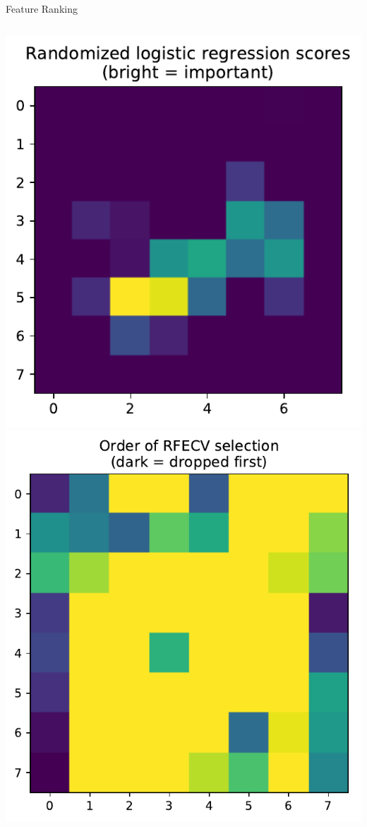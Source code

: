 \documentclass[10pt, aspectratio=169]{beamer} %
\begin{document}
\begin{frame}[fragile]{Feature Ranking}
\begin{columns}
\begin{center}
\includegraphics[width=\columnwidth]{RLR_ranking.pdf}\\
\includegraphics[width=\columnwidth]{RVECF_ranking.pdf}
\end{center}
\end{columns}
\end{frame}
\end{document}

